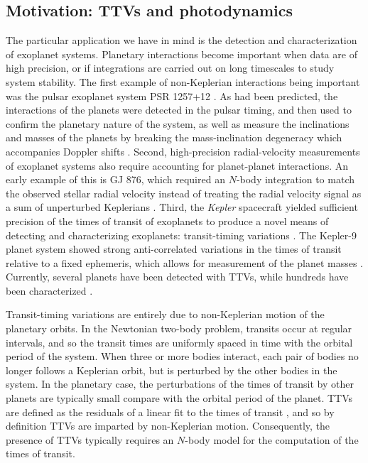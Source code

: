 \documentclass[fleqn,usenatbib,twocolumn]{mnras}
\begin{document}
\subsection{Motivation: TTVs and photodynamics}
The particular application we have in mind is the detection and
characterization of exoplanet systems.
Planetary interactions become important when data are of high precision, or
if integrations are carried out on long timescales to study system
stability.  The first example of non-Keplerian
interactions being important was the pulsar exoplanet system PSR 1257+12
\citep{Wolszczan1992}.  As had been predicted, the interactions of the planets were detected
in the pulsar timing, and then used to confirm the
planetary nature of the system, as well as measure the inclinations
and masses of the planets by breaking the mass-inclination degeneracy which accompanies Doppler shifts \citep{Rasio1992,Malhotra1992,Peale1993,
Wolszczan1994}.
Second, high-precision radial-velocity measurements of
exoplanet systems also require accounting for planet-planet interactions.
An early example of this is GJ 876, which required an $N$-body integration
to match the observed stellar radial velocity instead of treating
the radial velocity signal as a sum of unperturbed Keplerians
\citep{Laughlin2001}.  Third, the {\em Kepler} spacecraft
yielded sufficient precision of the times of transit of exoplanets
to produce a novel means of detecting and characterizing exoplanets:
transit-timing variations \citep[TTVs;][]{Holman2005,Agol2005}.
The Kepler-9 planet system showed strong anti-correlated variations
in the times of transit relative to a fixed ephemeris, which allows
for measurement of the planet masses \citep{Holman2010,Freudenthal2018,Borsato2019}.
Currently, several planets have been detected with TTVs, while hundreds
have been characterized \citep[see][and references therein]{Agol2017,JontofHutter2019}.

Transit-timing variations are entirely due to non-Keplerian motion of the
planetary orbits.  In the Newtonian two-body problem, transits occur at
regular intervals, and so the transit times are uniformly spaced in
time with the orbital period of the system.  When three or more bodies
interact, each pair of bodies no longer follows a Keplerian orbit,
but is perturbed by the other bodies in the system.  In the planetary
case, the perturbations of the times of transit by other planets
are typically small compare with the orbital period of the planet.
TTVs are defined as the residuals of a linear fit to the times of
transit \citep{Agol2005}, and so by definition TTVs are imparted by
non-Keplerian motion. Consequently, the presence of TTVs typically requires an $N$-body
model for the computation of the times of transit.
\end{document}
